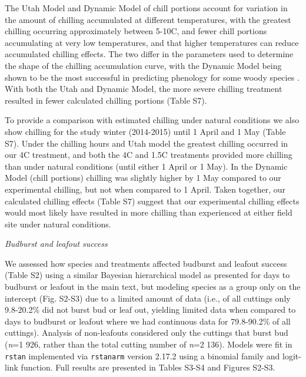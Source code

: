 \documentclass{article}
\begin{document}
\noindent The Utah Model and Dynamic Model of chill portions account for variation in the amount of chilling accumulated at different temperatures, with the greatest chilling occurring approximately between 5-10\degree C, and fewer chill portions accumulating at very low temperatures, and that higher temperatures can reduce accumulated chilling effects. The two differ in the parameters used to determine the shape of the chilling accumulation curve, with the Dynamic Model being shown to be the most successful in predicting phenology for some woody species \citep{Luedeling:2009}. With both the Utah and Dynamic Model, the more severe chilling treatment resulted in fewer calculated chilling portions (Table S7). 

\noindent To provide a comparison with estimated chilling under natural conditions we also show chilling for the study winter (2014-2015) until 1 April and 1 May (Table S7). Under the chilling hours and Utah model the greatest chilling occurred in our 4\degree C treatment, and both the 4\degree C and 1.5\degree C treatments provided more chilling than under natural conditions (until either 1 April or 1 May). In the Dynamic Model (chill portions) chilling was slightly higher by 1 May compared to our experimental chilling, but not when compared to 1 April. Taken together, our calculated chilling effects (Table S7) suggest that our experimental chilling effects would most likely have resulted in more chilling than experienced at either field site under natural conditions. 

\noindent\emph{Budburst and leafout success}

\noindent We assessed how species and treatments affected budburst and leafout success (Table S2) using a similar Bayesian hierarchical model as presented for days to budburst or leafout in the main text, but modeling species as a group only on the intercept (Fig. S2-S3) due to a limited amount of data (i.e., of all cuttings only 9.8-20.2\% did not burst bud or leaf out, yielding limited data when compared to days to budburst or leafout where we had continuous data for 79.8-90.2\% of all cuttings). Analysis of non-leafouts considered only the cuttings that burst bud (\emph{n}=1 926, rather than the total cutting number of \emph{n}=2 136). Models were fit in \verb|rstan| implemented via  \verb|rstanarm| version 2.17.2 using a binomial family and logit-link function. Full results are presented in Tables S3-S4 and Figures S2-S3.
\end{document}
